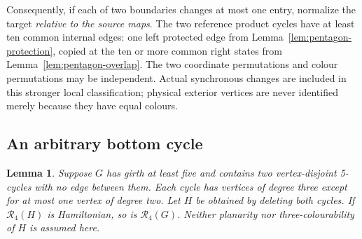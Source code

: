 \documentclass[11pt]{article}
\newtheorem{lemma}[theorem]{Lemma}
\theoremstyle{remark}
\newcommand{\R}{\mathcal R}
\numberwithin{equation}{section}
\begin{document}
Consequently, if each of two boundaries changes at most one entry,
normalize the target \emph{relative to the source maps}. The two
reference product cycles have at least ten common internal edges:
one left protected edge from Lemma~\ref{lem:pentagon-protection},
copied at the ten or more common right states from
Lemma~\ref{lem:pentagon-overlap}.
The two coordinate permutations and colour permutations may be
independent. Actual synchronous changes are included in this stronger
local classification; physical exterior vertices are never identified
merely because they have equal colours.

\subsection{An arbitrary bottom cycle}
\begin{lemma}\label{lem:two-pentagons-restore}
Suppose $G$ has girth at least five and contains two vertex-disjoint
5-cycles with no edge between them. Each cycle has vertices of degree
three except for at most one vertex of degree two.
Let $H$ be obtained by deleting both cycles. If $\R_4(H)$ is
Hamiltonian, so is $\R_4(G)$.
Neither planarity nor three-colourability of $H$ is assumed here.
\end{lemma}
\end{document}
